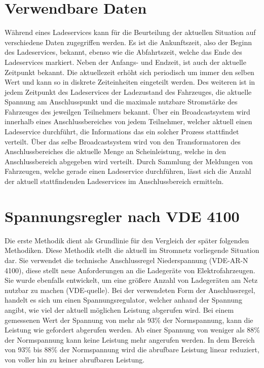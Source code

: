\section{Verwendbare Daten}
\label{cap:background_sec:setting}
Während eines Ladeservices kann für die Beurteilung der aktuellen Situation auf verschiedene Daten zugegriffen werden. Es ist die Ankunftszeit, also der Beginn des Ladeservices, bekannt, ebenso wie die Abfahrtszeit, welche das Ende des Ladeservices markiert. Neben der Anfangs- und Endzeit, ist auch der aktuelle Zeitpunkt bekannt. Die aktuellezeit erhöht sich periodisch um immer den selben Wert und kann so in diskrete Zeiteinheiten eingeteilt werden. Des weiteren ist in jedem Zeitpunkt des Ladeservices der Ladezustand des Fahrzeuges, die aktuelle Spannung am Anschlusspunkt und die maximale nutzbare Stromstärke des Fahrzeuges des jeweilgen Teilnehmers bekannt. Über ein Broadcastsystem wird innerhalb eines Anschlussbereiches von jedem Teilnehmer, welcher aktuell einen Ladeservice durchführt, die Informations das ein solcher Prozess stattfindet verteilt. Über das selbe Broadcastsystem wird von den Transformatoren des Anschlussbereiches die aktuelle Menge an Scheinleistung, welche in den Anschlussbereich abgegeben wird verteilt. Durch Sammlung der Meldungen von Fahrzeugen, welche gerade einen Ladeservice durchführen, lässt sich die Anzahl der aktuell stattfindenden Ladeservices im Anschlussbereich ermitteln.

\section{Spannungsregler nach VDE 4100}
\label{capBody:VDE}
Die erste Methodik dient als Grundlinie für den Vergleich der später folgenden Methodiken. Diese Methodik stellt die aktuell im Stromnetz vorliegende Situation dar. Sie verwendet die technische Anschlussregel Niederspannung (VDE-AR-N 4100), diese stellt neue Anforderungen an die Ladegeräte von Elektrofahrzeugen. Sie wurde ebenfalls entwickelt, um eine größere Anzahl von Ladegeräten am Netz nutzbar zu machen (VDE-quelle). Bei der verwendeten Form der Anschlussregel, handelt es sich um einen Spannungsregulator, welcher anhand der Spannung angibt, wie viel der aktuell möglichen Leistung abgerufen wird. Bei einem gemessenen Wert der Spannung von mehr als 93\% der Normspannung, kann die Leistung wie gefordert abgerufen werden. Ab einer Spannung von weniger als 88\% der Normspannung kann keine Leistung mehr angerufen werden. In dem Bereich von 93\% bis 88\% der Normspannung wird die abrufbare Leistung linear reduziert, von voller hin zu keiner abrufbaren Leistung.


